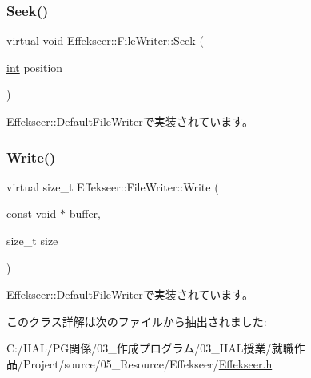 \subsubsection{\texorpdfstring{Seek()}{Seek()}}
{\footnotesize\ttfamily virtual \mbox{\hyperlink{namespace_effekseer_ab34c4088e512200cf4c2716f168deb56}{void}} Effekseer\+::\+File\+Writer\+::\+Seek (\begin{DoxyParamCaption}\item[{\mbox{\hyperlink{namespace_effekseer_ace0abf7c2e6947e519ebe8b54cbcc30a}{int}}}]{position }\end{DoxyParamCaption})\hspace{0.3cm}{\ttfamily [pure virtual]}}



\mbox{\hyperlink{class_effekseer_1_1_default_file_writer_a2329533000c58267e8e2457f3480bf73}{Effekseer\+::\+Default\+File\+Writer}}で実装されています。

\mbox{\label{class_effekseer_1_1_file_writer_a7bdd5dc4f70f8e83c03de7e96af5dc27}} 
\subsubsection{\texorpdfstring{Write()}{Write()}}
{\footnotesize\ttfamily virtual size\+\_\+t Effekseer\+::\+File\+Writer\+::\+Write (\begin{DoxyParamCaption}\item[{const \mbox{\hyperlink{namespace_effekseer_ab34c4088e512200cf4c2716f168deb56}{void}} $\ast$}]{buffer,  }\item[{size\+\_\+t}]{size }\end{DoxyParamCaption})\hspace{0.3cm}{\ttfamily [pure virtual]}}



\mbox{\hyperlink{class_effekseer_1_1_default_file_writer_afceaff03cd45477058ffdc1370d06884}{Effekseer\+::\+Default\+File\+Writer}}で実装されています。



このクラス詳解は次のファイルから抽出されました\+:\begin{DoxyCompactItemize}
\item 
C\+:/\+H\+A\+L/\+P\+G関係/03\+\_\+作成プログラム/03\+\_\+\+H\+A\+L授業/就職作品/\+Project/source/05\+\_\+\+Resource/\+Effekseer/\mbox{\hyperlink{_effekseer_8h}{Effekseer.\+h}}\end{DoxyCompactItemize}
